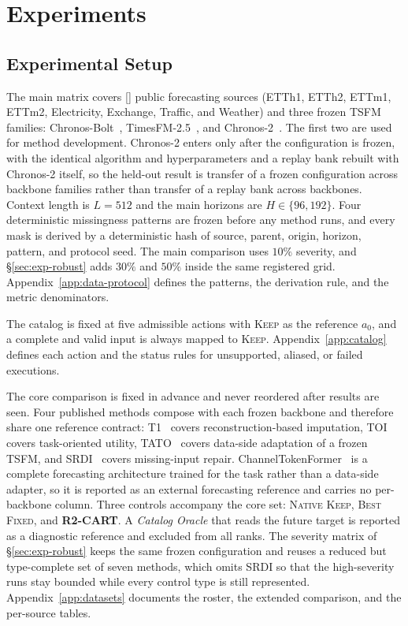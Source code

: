 \documentclass{article}
\newcommand{\ph}[1]{\textcolor{phgray}{\textsf{[\detokenize{#1}]}}}
\newcommand{\tsfm}{TSFM}
\begin{document}
\section{Experiments}
\label{sec:exp}

\subsection{Experimental Setup}
\label{sec:exp-setup}
The main matrix covers \ph{N_DATASETS} public forecasting sources (ETTh1, ETTh2, ETTm1, ETTm2,
Electricity, Exchange, Traffic, and Weather) and three frozen \tsfm{} families:
Chronos-Bolt~\citep{chronosbolt2025}, TimesFM-2.5~\citep{das2024timesfm}, and
Chronos-2~\citep{chronos2_2025}. The first two are used for method development. Chronos-2
enters only after the configuration is frozen, with the identical algorithm and hyperparameters
and a replay bank rebuilt with Chronos-2 itself, so the held-out result is transfer of a frozen
configuration across backbone families rather than transfer of a replay bank across backbones.
Context length is $L = 512$ and the main horizons are $H \in \{96, 192\}$. Four deterministic
missingness patterns are frozen before any method runs, and every mask is derived by a
deterministic hash of source, parent, origin, horizon, pattern, and protocol seed. The main
comparison uses $10\%$ severity, and \S\ref{sec:exp-robust} adds $30\%$ and $50\%$ inside the
same registered grid. Appendix~\ref{app:data-protocol} defines the patterns, the derivation
rule, and the metric denominators.

The catalog is fixed at five admissible actions with \textsc{Keep} as the reference $a_0$, and
a complete and valid input is always mapped to \textsc{Keep}. Appendix~\ref{app:catalog}
defines each action and the status rules for unsupported, aliased, or failed executions.

The core comparison is fixed in advance and never reordered after results are seen. Four
published methods compose with each frozen backbone and therefore share one reference contract:
T1~\citep{park2026t1} covers reconstruction-based imputation,
TOI~\citep{wang2024taskoriented} covers task-oriented utility,
TATO~\citep{qiu2026tato} covers data-side adaptation of a frozen \tsfm{}, and
SRDI~\citep{xu2026srdi} covers missing-input repair.
ChannelTokenFormer~\citep{jang2026channeltokenformer} is a complete forecasting architecture
trained for the task rather than a data-side adapter, so it is reported as an external
forecasting reference and carries no per-backbone column. Three controls accompany the core
set: \textsc{Native Keep}, \textsc{Best Fixed}, and \textbf{R2-CART}. A \emph{Catalog Oracle}
that reads the future target is reported as a diagnostic reference and excluded from all ranks.
The severity matrix of \S\ref{sec:exp-robust} keeps the same frozen configuration and reuses a
reduced but type-complete set of seven methods, which omits SRDI so that the high-severity runs
stay bounded while every control type is still represented. Appendix~\ref{app:datasets}
documents the roster, the extended comparison, and the per-source tables.
\end{document}
